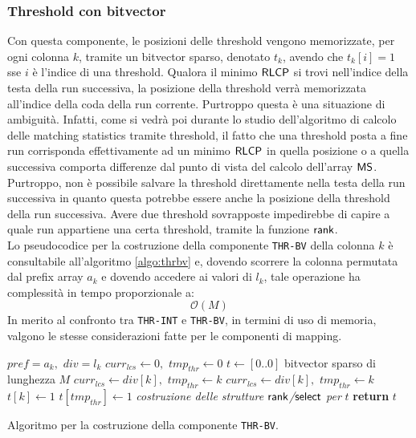 \subsubsection{Threshold con bitvector}
Con questa componente, le posizioni delle threshold vengono
memorizzate, per ogni colonna $k$, tramite un bitvector sparso, denotato
$t_k$, avendo che $t_k[i]=1$ sse $i$ è l'indice di una threshold.
Qualora il minimo $\mbox{\rm {\sf RLCP}}$ si trovi nell'indice della testa della run
successiva, la posizione della threshold verrà memorizzata all'indice
della coda della run corrente. Purtroppo questa è una situazione di ambiguità.
Infatti, come si vedrà poi durante lo studio dell'algoritmo di calcolo delle
matching statistics tramite threshold, il fatto che una threshold posta a fine
run corrisponda effettivamente ad un minimo $\mbox{\rm {\sf RLCP}}$ in quella posizione o a
quella successiva comporta differenze dal punto di vista del calcolo dell'array
$\mbox{\rm {\sf MS}}$. 
Purtroppo, non è possibile salvare la threshold direttamente nella testa della
run successiva in quanto questa potrebbe essere anche la posizione della
threshold della run successiva. Avere due threshold sovrapposte impedirebbe di
capire a quale run appartiene una certa threshold, tramite la funzione
$\mbox{\rm {\sf rank}}$. \\
Lo pseudocodice per la costruzione della componente
\texttt{THR-BV} della colonna $k$ è consultabile all'algoritmo \ref{algo:thrbv}
e, dovendo scorrere la colonna permutata dal prefix array $a_k$ e dovendo
accedere ai valori di $l_k$, tale operazione ha complessità in tempo
proporzionale a:
\begin{equation}
  \label{eq:thrbv}
  \mathcal{O}(M)
\end{equation}
\noindent
In merito al confronto tra \texttt{THR-INT} e \texttt{THR-BV}, in termini di uso
di memoria, valgono le stesse considerazioni fatte per le componenti di mapping.
\begin{algorithm}
  \begin{algorithmic}
    \Comment $pref=a_k,\,\,div=l_k$
    \State $curr_{lcs}\gets 0,\,\,tmp_{thr}\gets 0$
    \State $t\gets[0..0]$
    \Comment bitvector sparso di lunghezza $M$
    \For {\textit{every} $k\in\left[0,\,\, M\right)$}
    \State $curr_{lcs}\gets div[k],\,\,tmp_{thr}\gets k$
    \EndIf
    \State $curr_{lcs}\gets div[k],\,\,tmp_{thr}\gets k$
    \EndIf
    \State $t[k]\gets 1$
    \Else
    \State $t[tmp_{thr}]\gets 1$
    \EndIf
    \EndIf
    \EndFor
    \State \textit{costruzione delle strutture $\mbox{\rm {\sf rank}}$/$\mbox{\rm {\sf select}}$ per} $t$
    \State \textbf{return} $t$  
    \EndFunction
  \end{algorithmic}
  \caption{Algoritmo per la costruzione della componente \texttt{THR-BV}.}
  \label{algo:thrbv}
\end{algorithm}
